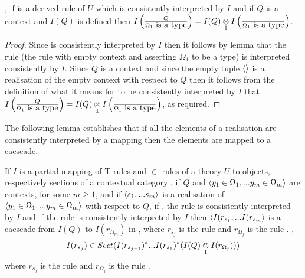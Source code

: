 \begin{lemma}
\IfIpartialmappingUtoC,
if \ZOmega is a derived rule of $U$  which  is consistently interpreted by $I$ 
and if $Q$ is a context and $I(Q)$ is defined 
then $\Imappedrule{Q}{\isT{\Omega_1}}=\crossx{I(Q)}{\Imappedrule{}{\isT{\Omega_1}}}{1}$.
\end{lemma}
\begin{proof}
Since \ZOmega is consistently interpreted by $I$ then it follows by lemma  that the rule 
\gatdisplayrule{}{\isT{\Omega}} (the rule with empty context and asserting $\Omega_1$ to be a type) is interpreted consistently
by $I$. Since $Q$ is a context and since the empty tuple $\tuple{}$ is a realisation of the empty context with respect to $Q$ then it follows from the definition of what it means for  \gatdisplayrule{}{\isT{\Omega}} to be consistently interpreted by $I$ that
$\Imappedrule{Q}{\isT{\Omega_1}}=\crossx{I(Q)}{\Imappedrule{}{\isT{\Omega_1}}}{1}$, as required.
\end{proof}
The following lemma establishes that if all the elements of a realisation are consistently interpreted by a mapping then the elements are 
mapped to a cacscade. 
\begin{lemma}
\newcommand {\forceSOURCEwidth}{\rule{5cm}{0pt}}  %
\newcommand {\forceTARGETwidth}{\rule{2.2cm}{0pt}}
If $I$ is a partial mapping of T-rules and $\in$-rules of a theory $U$ to objects, respectively sections of a contextual category \catcw,
 if $Q$  and $\encyOmega{m}$ are contexts, for some $m \geq 1$,  and if $\tuple{\sm}$ is a realisation of $\tuple{\yOmega{m}}$ with respect to $Q$,
 if \foreachj, the rule  is consistently interpreted by $I$ 
 and if the rule  is consistently interpreted by $I$
then $\tuple{I(r_{s_1},...I(r_{s_m}}$ is a cacscade from $I(Q)$ to $I(r_{\Omega_m})$ in \catc,
where $r_{s_j}$ is the rule  and $r_{\Omega_j}$ is the rule .
\foreachj,  $$I(r_{s_j}) \in Sect(I(r_{s_{j-1}})^*...I(r_{s_1})^*(\crossx{I(Q)}{I(r_{\Omega_j})}{1}))$$
 where $r_{s_j}$ is the rule  and $r_{\Omega_j}$ is the rule .
\end{lemma}
